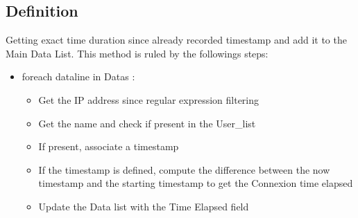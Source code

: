 \documentclass[letterpaper,10pt,english]{sphinxmanual}
\begin{document}
\subsection{Definition}
\label{\detokenize{OUP/get_time:definition}}
\sphinxAtStartPar
Getting exact time duration since already recorded timestamp and add it to the Main Data List.
This method is ruled by the followings steps:
\begin{itemize}
\item {} 
\sphinxAtStartPar
foreach dataline in Datas :
\begin{itemize}
\item {} 
\sphinxAtStartPar
Get the IP address since regular expression filtering

\item {} 
\sphinxAtStartPar
Get the name and check if present in the User\_list

\item {} 
\sphinxAtStartPar
If present, associate a timestamp

\item {} 
\sphinxAtStartPar
If the timestamp is defined, compute the difference between the now timestamp and the starting timestamp to get the Connexion time elapsed

\item {} 
\sphinxAtStartPar
Update the Data list with the Time Elapsed field

\end{itemize}

\end{itemize}
\end{document}
